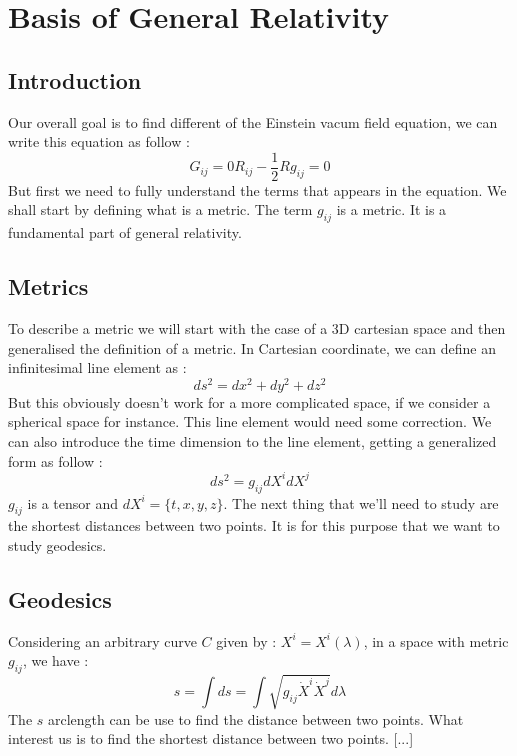 \documentclass{article}
\begin{document}
    \section{Basis of General Relativity}
        \subsection{Introduction}
            Our overall goal is to find different of the Einstein vacum field equation, we can write this equation as follow :
            \begin{equation*}
                G_{ij} = 0
                R_{ij}-\frac{1}{2} R g_{ij} = 0
            \end{equation*}
            But first we need to fully understand the terms that appears in the equation.
            We shall start by defining what is a metric.
            The term $g_{ij}$ is a metric.
            It is a fundamental part of general relativity.
        \subsection{Metrics}
            To describe a metric we will start with the case of a 3D cartesian space and then generalised the definition of a metric.
            In Cartesian coordinate, we can define an infinitesimal line element as :
            \begin{equation*}
                ds^2 = dx^2 + dy^2 + dz^2
            \end{equation*}
            But this obviously doesn't work for a more complicated space, if we consider a spherical space for instance.
            This line element would need some correction.
            We can also introduce the time dimension to the line element, getting a generalized form as follow : 
            \begin{equation}
                ds^2 = g_{ij}dX^idX^j
            \end{equation}
            $g_{ij}$ is a tensor and $dX^i=\{t,x,y,z\}$.
            The next thing that we'll need to study are the shortest distances between two points.
            It is for this purpose that we want to study geodesics.
        \subsection{Geodesics}
            Considering an arbitrary curve $C$ given by : $X^i=X^i(\lambda)$, in a space with metric $g_{ij}$, we have :
            \begin{equation}
                s = \int ds=\int\sqrt{g_{ij}\dot{X}^i\dot{X}^j}d\lambda
            \end{equation}
            The $s$ arclength can be use to find the distance between two points.
            What interest us is to find the shortest distance between two points.
            [...]
\end{document}
